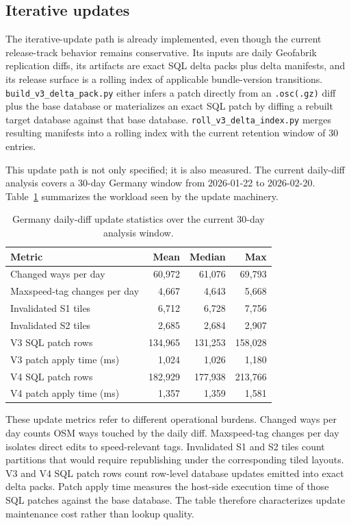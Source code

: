 \documentclass{article}
\begin{document}
\subsection{Iterative updates}
The iterative-update path is already implemented, even though the current release-track behavior remains conservative. Its inputs are daily Geofabrik replication diffs, its artifacts are exact SQL delta packs plus delta manifests, and its release surface is a rolling index of applicable bundle-version transitions. \texttt{build\_v3\_delta\_pack.py} either infers a patch directly from an \texttt{.osc(.gz)} diff plus the base database or materializes an exact SQL patch by diffing a rebuilt target database against that base database. \texttt{roll\_v3\_delta\_index.py} merges resulting manifests into a rolling index with the current retention window of 30 entries.

This update path is not only specified; it is also measured. The current daily-diff analysis covers a 30-day Germany window from 2026-01-22 to 2026-02-20. Table~\ref{tab:update_stats} summarizes the workload seen by the update machinery.

\begin{table}[!htbp]
\centering
\caption{Germany daily-diff update statistics over the current 30-day analysis window.}
\label{tab:update_stats}
\begin{tabular}{p{6.0cm}rrr}
\toprule
Metric & Mean & Median & Max \\
\midrule
Changed ways per day & 60{,}972 & 61{,}076 & 69{,}793 \\
Maxspeed-tag changes per day & 4{,}667 & 4{,}643 & 5{,}668 \\
Invalidated S1 tiles & 6{,}712 & 6{,}728 & 7{,}756 \\
Invalidated S2 tiles & 2{,}685 & 2{,}684 & 2{,}907 \\
V3 SQL patch rows & 134{,}965 & 131{,}253 & 158{,}028 \\
V3 patch apply time (ms) & 1{,}024 & 1{,}026 & 1{,}180 \\
V4 SQL patch rows & 182{,}929 & 177{,}938 & 213{,}766 \\
V4 patch apply time (ms) & 1{,}357 & 1{,}359 & 1{,}581 \\
\bottomrule
\end{tabular}
\end{table}

These update metrics refer to different operational burdens. Changed ways per day counts OSM ways touched by the daily diff. Maxspeed-tag changes per day isolates direct edits to speed-relevant tags. Invalidated S1 and S2 tiles count partitions that would require republishing under the corresponding tiled layouts. V3 and V4 SQL patch rows count row-level database updates emitted into exact delta packs. Patch apply time measures the host-side execution time of those SQL patches against the base database. The table therefore characterizes update maintenance cost rather than lookup quality.
\end{document}
